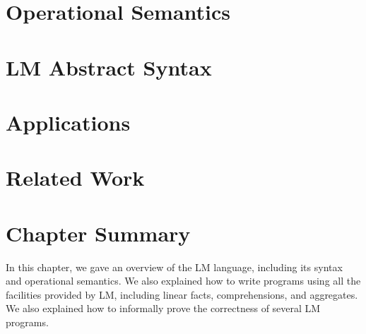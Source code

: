 \section{Operational Semantics}\label{sec:language:semantics}


\section{LM Abstract Syntax}

\section{Applications}


\section{Related Work}\label{section:language:related}

\section{Chapter Summary}

In this chapter, we gave an overview of the LM language, including its syntax
and operational semantics. We also explained how to write programs using all the
facilities provided by LM, including linear facts, comprehensions, and
aggregates. We also explained how to informally prove the correctness of several
LM programs.
